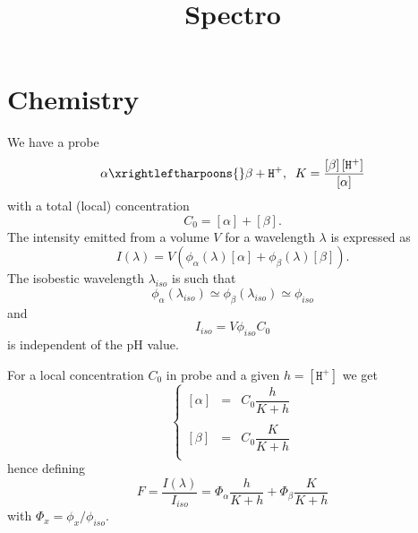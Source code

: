 \documentclass[aps]{revtex4}
\newcommand{\mychem}[1]{\mathtt{#1}}
\newcommand{\myconc}[1]{\left\lbrack{#1}\right\rbrack}
\newcommand{\plus}{\mychem{+}}
\newcommand{\proton}{\mychem{H}^\plus}
\begin{document}
\title{Spectro}
\maketitle

\section{Chemistry}
We have a probe
\begin{equation}
	\alpha \xrightleftharpoons{} \beta + \proton, \;\; K = \dfrac{\myconc{\beta}\myconc{\proton}}{ \myconc{\alpha} }
\end{equation}
with a total (local) concentration 
\begin{equation}
C_0 = \myconc{\alpha} + \myconc{\beta}.
\end{equation}
The intensity emitted from a volume $V$ for a wavelength $\lambda$ is expressed as
\begin{equation}
	I(\lambda) = V \left( \phi_\alpha(\lambda) \myconc{\alpha}  + \phi_\beta(\lambda) \myconc{\beta} \right).
\end{equation}
The isobestic wavelength $\lambda_{iso}$  is such that 
\begin{equation}
	\phi_\alpha(\lambda_{iso}) \simeq \phi_\beta(\lambda_{iso}) \simeq \phi_{iso}
\end{equation}
and
\begin{equation}
	I_{iso} = V  \phi_{iso} C_0
\end{equation}
is independent of the pH value.

For a local concentration $C_0$ in probe and a given $h=\myconc{\proton}$ we get
\begin{equation}
\left\lbrace
\begin{array}{rcl}
	 \myconc{\alpha}  & = & C_0 \dfrac{h}{K+h}\\
	 \\
	 \myconc{\beta}   & = & C_0 \dfrac{K}{K+h}\\
\end{array}
\right.
\end{equation}
hence defining
\begin{equation}
	F = \dfrac{I(\lambda)}{I_{iso}} = \Phi_\alpha \dfrac{h}{K+h} + \Phi_\beta \dfrac{K}{K+h}
\end{equation}
with $\Phi_x = \phi_x/\phi_{iso}$.
\end{document}
